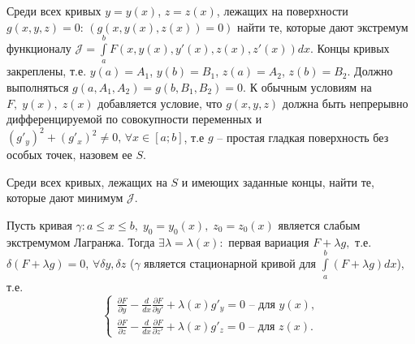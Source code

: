 Среди всех кривых $y=y(x)$, $z=z(x)$, лежащих на поверхности $g(x,y,z)=0$: $(g(x,y(x),z(x))=0)$ найти те, которые дают экстремум функционалу $\mathcal{J}=\int\limits_a^b F(x,y(x),y'(x),z(x),z'(x))d x$. Концы кривых закреплены, т.е. $y(a)=A_1$, $y(b)=B_1$, $z(a)=A_2$, $z(b)=B_2$.
Должно выполняться $g(a,A_1,A_2)= g(b,B_1,B_2)=0$. К обычным условиям на $F,\;y(x),\;z(x)$ добавляется условие, что $g(x,y,z)$ должна быть непрерывно дифференцируемой по совокупности переменных и $(g'_y)^2+(g'_x)^2\neq 0, \,\forall x \in [a;b]$, т.е $g$ -- простая гладкая поверхность без особых точек, назовем ее $S$.

Среди всех кривых, лежащих на $S$ и имеющих заданные концы, найти те, которые дают минимум $\mathcal{J}$.
\begin{theorem}
Пусть кривая $\gamma:a\leqslant x\leqslant b,\; y_0=y_0(x),\;z_0=z_0(x)$ является слабым экстремумом Лагранжа. Тогда $\exists \lambda=\lambda(x):$ первая вариация $F+\lambda g,$ т.е. $\delta(F+\lambda g)=0, \, \forall \delta y, \delta z$ ($\gamma$ является стационарной кривой для $\int\limits_a^b(F+\lambda g)d x$), т.е.
\begin{equation*}
\begin{cases}
\frac{\partial F}{\partial y} - \frac{d}{d x}\frac{\partial F}{\partial y'}+\lambda (x)g'_y=0 \text{ -- для $y(x)$}, \\
\frac{\partial F}{\partial z} - \frac{d}{d x}\frac{\partial F}{\partial z'}+\lambda (x)g'_z=0 \text{ -- для $z(x)$}.
\end{cases}\end{equation*}
\end{theorem}
